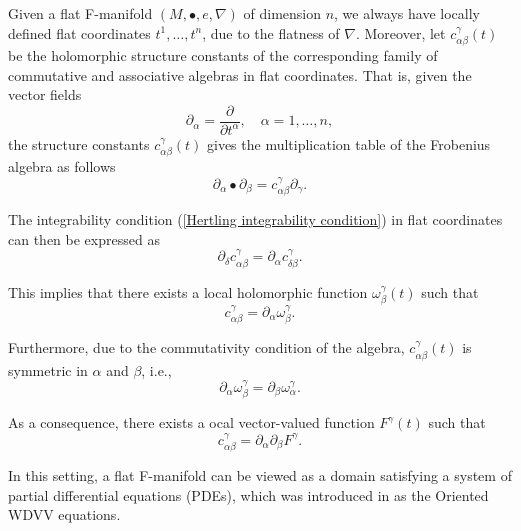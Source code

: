 \documentclass{article}
\theoremstyle{definition}
\begin{document}
Given a flat F-manifold \((M, \bullet, e, \nabla)\) of dimension \(n\), we always have locally defined flat coordinates \(t^1, \dots, t^n\), due to the flatness of \(\nabla\). Moreover, let \(c_{\alpha\beta}^{\gamma}(t)\) be the holomorphic structure constants of the corresponding family of commutative and associative algebras in flat coordinates. That is, given the vector fields  
\[
\partial_{\alpha} = \frac{\partial}{\partial t^{\alpha}}, \quad \alpha = 1, \dots, n,
\]  
the structure constants \(c_{\alpha\beta}^{\gamma}(t)\) gives the multiplication table of the Frobenius algebra as follows 
\begin{equation*}
\partial_{\alpha} \bullet \partial_{\beta} = c_{\alpha\beta}^{\gamma} \partial_{\gamma}.
\end{equation*}

The integrability condition (\ref{Hertling integrability condition}) in flat coordinates can then be expressed as  
\begin{equation*}
\partial_{\delta} c_{\alpha\beta}^{\gamma} = \partial_{\alpha} c_{\delta\beta}^{\gamma}.
\end{equation*}

This implies that there exists a local holomorphic function \(\omega_{\beta}^{\gamma}(t)\) such that  
\begin{equation*}
c_{\alpha\beta}^{\gamma} = \partial_{\alpha} \omega_{\beta}^{\gamma}.
\end{equation*}

Furthermore, due to the commutativity condition of the algebra, \(c_{\alpha\beta}^{\gamma}(t)\) is symmetric in \(\alpha\) and \(\beta\), i.e.,  
\begin{equation*}
\partial_{\alpha} \omega_{\beta}^{\gamma} = \partial_{\beta} \omega_{\alpha}^{\gamma}.
\end{equation*}

As a consequence, there exists a ocal vector-valued function \(F^{\gamma}(t)\) such that  
\begin{equation*}
c_{\alpha\beta}^{\gamma} = \partial_{\alpha} \partial_{\beta} F^{\gamma}.
\end{equation*}

In this setting, a flat F-manifold can be viewed as a domain satisfying a system of partial differential equations (PDEs), which was introduced in \cite{Alexander} as the Oriented WDVV equations.
\end{document}
